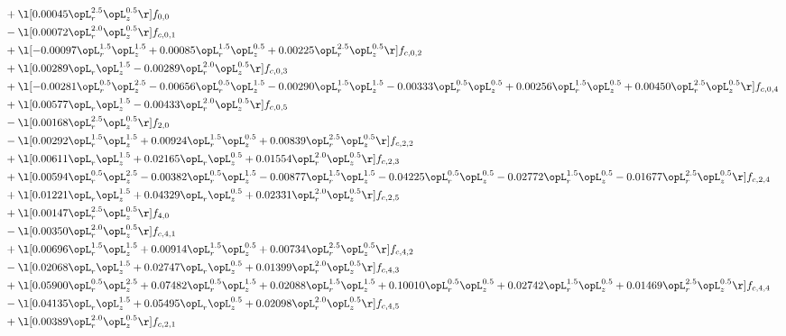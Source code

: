 \begin{alignat}{2}
& + \l[  0.00045 \opL_r^{2.5} \opL_z^{0.5}  \r] f_{0,0} \nonumber \\ 
& - \l[  0.00072 \opL_r^{2.0} \opL_z^{0.5}  \r] f_{c,0,1} \nonumber \\ 
& + \l[  -0.00097 \opL_r^{1.5} \opL_z^{1.5} +  0.00085 \opL_r^{1.5} \opL_z^{0.5} +  0.00225 \opL_r^{2.5} \opL_z^{0.5}  \r] f_{c,0,2} \nonumber \\ 
& + \l[  0.00289 \opL_r \opL_z^{1.5}   -0.00289 \opL_r^{2.0} \opL_z^{0.5}  \r] f_{c,0,3} \nonumber \\ 
& + \l[  -0.00281 \opL_r^{0.5} \opL_z^{2.5}   -0.00656 \opL_r^{0.5} \opL_z^{1.5}   -0.00290 \opL_r^{1.5} \opL_z^{1.5}   -0.00333 \opL_r^{0.5} \opL_z^{0.5} +  0.00256 \opL_r^{1.5} \opL_z^{0.5} +  0.00450 \opL_r^{2.5} \opL_z^{0.5}  \r] f_{c,0,4} \nonumber \\ 
& + \l[  0.00577 \opL_r \opL_z^{1.5}   -0.00433 \opL_r^{2.0} \opL_z^{0.5}  \r] f_{c,0,5} \nonumber \\ 
& - \l[  0.00168 \opL_r^{2.5} \opL_z^{0.5}  \r] f_{2,0} \nonumber \\ 
& - \l[  0.00292 \opL_r^{1.5} \opL_z^{1.5} +  0.00924 \opL_r^{1.5} \opL_z^{0.5} +  0.00839 \opL_r^{2.5} \opL_z^{0.5}  \r] f_{c,2,2} \nonumber \\ 
& + \l[  0.00611 \opL_r \opL_z^{1.5} +  0.02165 \opL_r \opL_z^{0.5} +  0.01554 \opL_r^{2.0} \opL_z^{0.5}  \r] f_{c,2,3} \nonumber \\ 
& + \l[  0.00594 \opL_r^{0.5} \opL_z^{2.5}   -0.00382 \opL_r^{0.5} \opL_z^{1.5}   -0.00877 \opL_r^{1.5} \opL_z^{1.5}   -0.04225 \opL_r^{0.5} \opL_z^{0.5}   -0.02772 \opL_r^{1.5} \opL_z^{0.5}   -0.01677 \opL_r^{2.5} \opL_z^{0.5}  \r] f_{c,2,4} \nonumber \\ 
& + \l[  0.01221 \opL_r \opL_z^{1.5} +  0.04329 \opL_r \opL_z^{0.5} +  0.02331 \opL_r^{2.0} \opL_z^{0.5}  \r] f_{c,2,5} \nonumber \\ 
& + \l[  0.00147 \opL_r^{2.5} \opL_z^{0.5}  \r] f_{4,0} \nonumber \\ 
& - \l[  0.00350 \opL_r^{2.0} \opL_z^{0.5}  \r] f_{c,4,1} \nonumber \\ 
& + \l[  0.00696 \opL_r^{1.5} \opL_z^{1.5} +  0.00914 \opL_r^{1.5} \opL_z^{0.5} +  0.00734 \opL_r^{2.5} \opL_z^{0.5}  \r] f_{c,4,2} \nonumber \\ 
& - \l[  0.02068 \opL_r \opL_z^{1.5} +  0.02747 \opL_r \opL_z^{0.5} +  0.01399 \opL_r^{2.0} \opL_z^{0.5}  \r] f_{c,4,3} \nonumber \\ 
& + \l[  0.05900 \opL_r^{0.5} \opL_z^{2.5} +  0.07482 \opL_r^{0.5} \opL_z^{1.5} +  0.02088 \opL_r^{1.5} \opL_z^{1.5} +  0.10010 \opL_r^{0.5} \opL_z^{0.5} +  0.02742 \opL_r^{1.5} \opL_z^{0.5} +  0.01469 \opL_r^{2.5} \opL_z^{0.5}  \r] f_{c,4,4} \nonumber \\ 
& - \l[  0.04135 \opL_r \opL_z^{1.5} +  0.05495 \opL_r \opL_z^{0.5} +  0.02098 \opL_r^{2.0} \opL_z^{0.5}  \r] f_{c,4,5} \nonumber \\ 
& + \l[  0.00389 \opL_r^{2.0} \opL_z^{0.5}  \r] f_{c,2,1} \nonumber \\ 
\end{alignat} 


